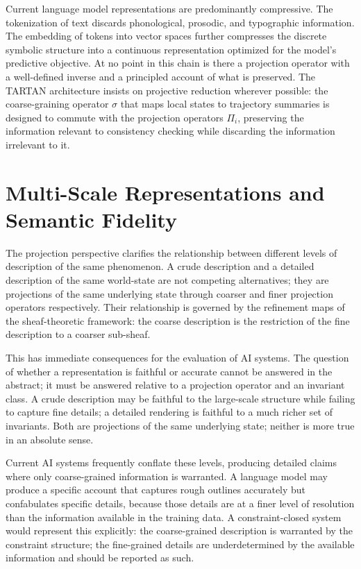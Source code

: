 \documentclass[11pt, oneside]{article}
\begin{document}
Current language model representations are predominantly compressive. The tokenization of text discards phonological, prosodic, and typographic information. The embedding of tokens into vector spaces further compresses the discrete symbolic structure into a continuous representation optimized for the model's predictive objective. At no point in this chain is there a projection operator with a well-defined inverse and a principled account of what is preserved. The TARTAN architecture insists on projective reduction wherever possible: the coarse-graining operator $\sigma$ that maps local states to trajectory summaries is designed to commute with the projection operators $\Pi_i$, preserving the information relevant to consistency checking while discarding the information irrelevant to it.

\section{Multi-Scale Representations and Semantic Fidelity}

The projection perspective clarifies the relationship between different levels of description of the same phenomenon. A crude description and a detailed description of the same world-state are not competing alternatives; they are projections of the same underlying state through coarser and finer projection operators respectively. Their relationship is governed by the refinement maps of the sheaf-theoretic framework: the coarse description is the restriction of the fine description to a coarser sub-sheaf.

This has immediate consequences for the evaluation of AI systems. The question of whether a representation is faithful or accurate cannot be answered in the abstract; it must be answered relative to a projection operator and an invariant class. A crude description may be faithful to the large-scale structure while failing to capture fine details; a detailed rendering is faithful to a much richer set of invariants. Both are projections of the same underlying state; neither is more true in an absolute sense.

Current AI systems frequently conflate these levels, producing detailed claims where only coarse-grained information is warranted. A language model may produce a specific account that captures rough outlines accurately but confabulates specific details, because those details are at a finer level of resolution than the information available in the training data. A constraint-closed system would represent this explicitly: the coarse-grained description is warranted by the constraint structure; the fine-grained details are underdetermined by the available information and should be reported as such.
\end{document}
